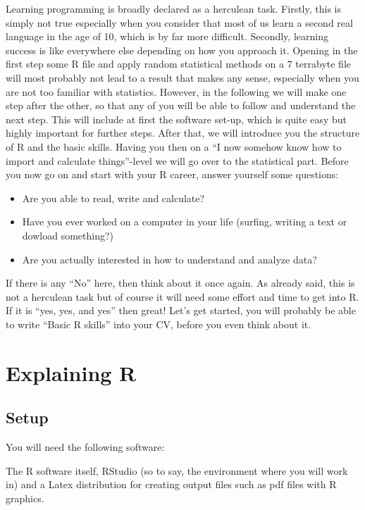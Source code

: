 \documentclass[]{report}
\begin{document}
Learning programming is broadly declared as a herculean task. Firstly,
this is simply not true especially when you consider that most of us
learn a second real language in the age of 10, which is by far more
difficult. Secondly, learning success is like everywhere else depending
on how you approach it. Opening in the first step some R file and apply
random statistical methods on a 7 terrabyte file will most probably not
lead to a result that makes any sense, especially when you are not too
familiar with statistics. However, in the following we will make one
step after the other, so that any of you will be able to follow and
understand the next step. This will include at first the software
set-up, which is quite easy but highly important for further steps.
After that, we will introduce you the structure of R and the basic
skills. Having you then on a ``I now somehow know how to import and
calculate things''-level we will go over to the statistical part. Before
you now go on and start with your R career, answer yourself some
questions:

\begin{itemize}
\item
  Are you able to read, write and calculate?
\item
  Have you ever worked on a computer in your life (surfing, writing a
  text or dowload something?)
\item
  Are you actually interested in how to understand and analyze data?
\end{itemize}

If there is any ``No'' here, then think about it once again. As already
said, this is not a herculean task but of course it will need some
effort and time to get into R. If it is ``yes, yes, and yes'' then
great! Let's get started, you will probably be able to write ``Basic R
skills'' into your CV, before you even think about it.

\part{Explaining R}\label{part-explaining-r}

\chapter{Setup}\label{setup}

You will need the following software:

The R software itself, RStudio (so to say, the environment where you
will work in) and a Latex distribution for creating output files such as
pdf files with R graphics.
\end{document}
